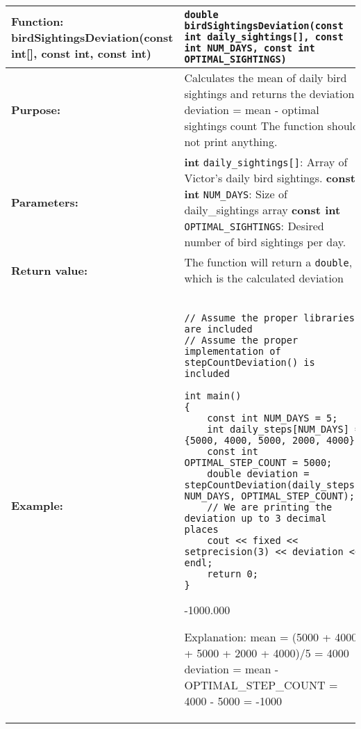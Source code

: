 \begin{longtable}[H]{|p{1.7in}|p{4.0in}|} \hline
        \textbf{Function:} \newline 
        birdSightingsDeviation(const int[], const int, const int) & \texttt{double birdSightingsDeviation(const int daily_sightings[], const int NUM_DAYS, const int OPTIMAL_SIGHTINGS)}
        \\ \hline
        \textbf{Purpose:}  & Calculates the mean of daily bird sightings and returns the deviation
deviation =  mean - optimal sightings count \newline
The function should not print anything.

\\ \hline
        \textbf{Parameters:} &  
        \textbf{int} \texttt{daily\_sightings[]}: Array of Victor’s daily bird sightings. \newline
        \textbf{const int} \texttt{NUM\_DAYS}: Size of daily\_sightings array\newline
        \textbf{const int} \texttt{OPTIMAL\_SIGHTINGS}: Desired number of bird sightings per day.
\\ \hline
        \textbf{Return value:} &  The function will return a \texttt{double}, which is the calculated deviation \newline 

\\ \hline
        \textbf{Example:} & 
        \begin{example}
        \begin{verbatim}

// Assume the proper libraries are included
// Assume the proper implementation of stepCountDeviation() is included

int main()
{
    const int NUM_DAYS = 5;
    int daily_steps[NUM_DAYS] = {5000, 4000, 5000, 2000, 4000};
    const int OPTIMAL_STEP_COUNT = 5000;
    double deviation = stepCountDeviation(daily_steps, NUM_DAYS, OPTIMAL_STEP_COUNT);
    // We are printing the deviation up to 3 decimal places
    cout << fixed << setprecision(3) << deviation << endl;
    return 0;
}
        \end{verbatim}
        \end{example}

        \begin{sample}
-1000.000
        \end{sample}
        Explanation: mean = (5000 + 4000 + 5000 + 2000 + 4000)/5 = 4000 \newline 
deviation = mean - OPTIMAL\_STEP\_COUNT = 4000 - 5000 = -1000
             \\ \hline
\end{longtable}

